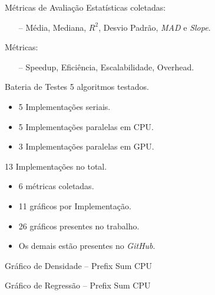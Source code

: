\begin{frame}{Métricas de Avaliação}
    Estatísticas coletadas:
    \begin{itemize}
        \item[--] Média, Mediana, $R^2$, Desvio Padrão, \textit{MAD} e \textit{Slope}.
    \end{itemize}
    \vspace{1em}
    Métricas:
    \begin{itemize}
        \item[--] Speedup, Eficiência, Escalabilidade, Overhead.
    \end{itemize}
\end{frame}

\begin{frame}{Bateria de Testes}
    5 algoritmos testados.
    \begin{itemize}
        \item 5 Implementações seriais.
        \item 5 Implementações paralelas em CPU.
        \item 3 Implementações paralelas em GPU.
    \end{itemize}
    13 Implementações no total.
    \vspace{1em}
    \begin{itemize}
        \item 6 métricas coletadas.
        \item 11 gráficos por Implementação.
        \item 26 gráficos presentes no trabalho.
        \item Os demais estão presentes no \textit{GitHub}.
    \end{itemize}
\end{frame}

\begin{frame}{Gráfico de Densidade -- Prefix Sum CPU}
    \begin{figure}
        \centering
        \resizebox{\textwidth}{!}{
            
        }
    \end{figure}
\end{frame}

\begin{frame}{Gráfico de Regressão -- Prefix Sum CPU}
    \begin{figure}
        \centering
        \resizebox{\textwidth}{!}{
            
        }
    \end{figure}
\end{frame}

